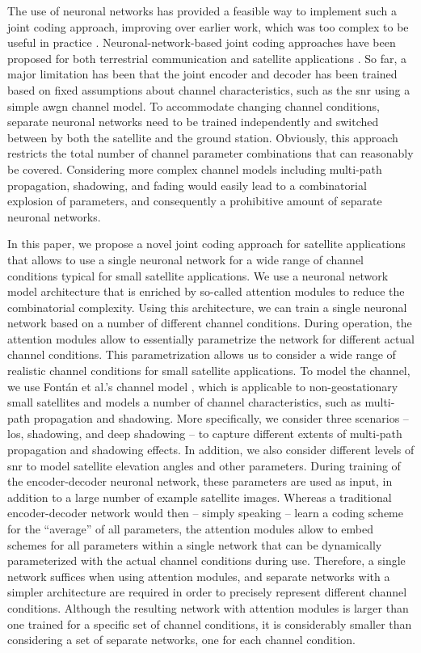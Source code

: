 \documentclass[conference]{IEEEtran}
\begin{document}
The use of neuronal networks has provided a feasible way to implement such a joint coding approach, improving over earlier work, which was too complex to be useful in practice \cite{9838671}.
Neuronal-network-based joint coding approaches have been proposed for both terrestrial communication \cite{Bourtsoulatze2019} and satellite applications \cite{satjscc}.
So far, a major limitation has been that the joint encoder and decoder has been trained based on fixed assumptions about channel characteristics, such as the \ac{snr} using a simple \ac{awgn} channel model.
To accommodate changing channel conditions, separate neuronal networks need to be trained independently and switched between by both the satellite and the ground station.
Obviously, this approach restricts the total number of channel parameter combinations that can reasonably be covered.
Considering more complex channel models including multi-path propagation, shadowing, and fading would easily lead to a combinatorial explosion of parameters, and consequently a prohibitive amount of separate neuronal networks.

In this paper, we propose a novel joint coding approach for satellite applications that allows to use a single neuronal network for a wide range of channel conditions typical for small satellite applications.
We use a neuronal network model architecture that is enriched by so-called attention modules to reduce the combinatorial complexity.
Using this architecture, we can train a single neuronal network based on a number of different channel conditions.
During operation, the attention modules allow to essentially parametrize the network for different actual channel conditions.
This parametrization allows us to consider a wide range of realistic channel conditions for small satellite applications.
To model the channel, we use Fontán et al.'s channel model \cite{fontan2001}, which is applicable to non-geostationary small satellites and models a number of channel characteristics, such as multi-path propagation and shadowing.
More specifically, we consider three scenarios -- \ac{los}, shadowing, and deep shadowing -- to capture different extents of multi-path propagation and shadowing effects.
In addition, we also consider different levels of \ac{snr} to model satellite elevation angles and other parameters.
During training of the encoder-decoder neuronal network, these parameters are used as input, in addition to a large number of example satellite images.
Whereas a traditional encoder-decoder network would then -- simply speaking -- learn a coding scheme for the \enquote{average} of all parameters, the attention modules allow to embed schemes for all parameters within a single network that can be dynamically parameterized with the actual channel conditions during use.
Therefore, a single network suffices when using attention modules, and separate networks with a simpler architecture are required in order to precisely represent different channel conditions.
Although the resulting network with attention modules is larger than one trained for a specific set of channel conditions, it is considerably smaller than considering a set of separate networks, one for each channel condition.
\end{document}
